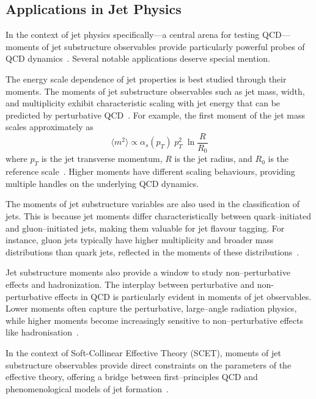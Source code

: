     \subsection{Applications in Jet Physics}
        In the context of jet physics specifically---a central arena for testing QCD---moments of jet substructure observables provide particularly powerful probes of QCD dynamics~\cite{CrispimRomao2024JetAnalysis, Dasgupta2013TowardsSubstructure}.
        Several notable applications deserve special mention.
        
        The energy scale dependence of jet properties is best studied through their moments.
        The moments of jet substructure observables such as jet mass, width, and multiplicity exhibit characteristic scaling with jet energy that can be predicted by perturbative QCD~\cite{Dasgupta2013TowardsSubstructure}. For example, the first moment of the jet mass scales approximately as
        \[
            \langle m^2 \rangle \propto \alpha_s(p_T) \;p_T^2 \;\ln\frac{R}{R_0}
        \]
        where $p_T$ is the jet transverse momentum, $R$ is the jet radius, and $R_0$ is the reference scale~\cite{ManganoINTRODUCTIONQCD, Kodaira1978HowQCD}.
        Higher moments have different scaling behaviours, providing multiple handles on the underlying QCD dynamics.

        The moments of jet substructure variables are also used in the classification of jets.
        This is because jet moments differ characteristically between quark--initiated and gluon--initiated jets, making them valuable for jet flavour tagging.
        For instance, gluon jets typically have higher multiplicity and broader mass distributions than quark jets, reflected in the moments of these distributions~\cite{Butter2023PerformanceTagging, Ali2011JETSQCD, SalehMoghaddam2022ComparisonConstant}.
    
        Jet substructure moments also provide a window to study non--perturbative effects and hadronization.
        The interplay between perturbative and non-perturbative effects in QCD is particularly evident in moments of jet observables.
        Lower moments often capture the perturbative, large--angle radiation physics, while higher moments become increasingly sensitive to non--perturbative effects like hadronisation~\cite{Dokshitzer1996DispersiveProcesses, Salam2001HadronShapes}.
    
        In the context of Soft-Collinear Effective Theory (SCET), moments of jet substructure observables provide direct constraints on the parameters of the effective theory, offering a bridge between first--principles QCD and phenomenological models of jet formation~\cite{Chien2014JetTheory, Ellis2010JetSCET, Lee2006MomentumTheory}.

